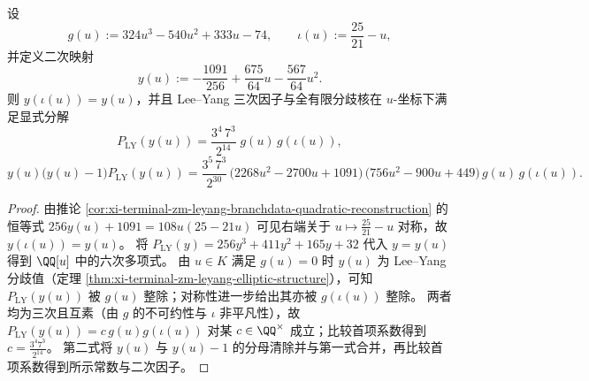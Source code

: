 \begin{proposition}\label{prop:xi-terminal-zm-leyang-double-cover-pullback-factorization}
设
\[
g(u):=324u^{3}-540u^{2}+333u-74,\qquad
\iota(u):=\frac{25}{21}-u,
\]
并定义二次映射
\[
y(u):=-\frac{1091}{256}+\frac{675}{64}u-\frac{567}{64}u^2.
\]
则 \(y(\iota(u))=y(u)\)，并且 Lee--Yang 三次因子与全有限分歧核在 \(u\)-坐标下满足显式分解
\[
P_{\mathrm{LY}}(y(u))=\frac{3^{4}\,7^{3}}{2^{14}}\; g(u)\,g(\iota(u)),
\]
\[
y(u)\bigl(y(u)-1\bigr)P_{\mathrm{LY}}(y(u))
=\frac{3^{5}\,7^{3}}{2^{30}}\,
\bigl(2268u^2-2700u+1091\bigr)\,
\bigl(756u^2-900u+449\bigr)\,
g(u)\,g(\iota(u)).
\]
\end{proposition}
\begin{proof}
由推论 \ref{cor:xi-terminal-zm-leyang-branchdata-quadratic-reconstruction} 的恒等式 \(256y(u)+1091=108u(25-21u)\) 可见右端关于 \(u\mapsto\frac{25}{21}-u\) 对称，故 \(y(\iota(u))=y(u)\)。
将 \(P_{\mathrm{LY}}(y)=256y^3+411y^2+165y+32\) 代入 \(y=y(u)\) 得到 \(\QQ[u]\) 中的六次多项式。
由 \(u\in K\) 满足 \(g(u)=0\) 时 \(y(u)\) 为 Lee--Yang 分歧值（定理 \ref{thm:xi-terminal-zm-leyang-elliptic-structure}），可知 \(P_{\mathrm{LY}}(y(u))\) 被 \(g(u)\) 整除；对称性进一步给出其亦被 \(g(\iota(u))\) 整除。
两者均为三次且互素（由 \(g\) 的不可约性与 \(\iota\) 非平凡性），故
\(
P_{\mathrm{LY}}(y(u))=c\,g(u)g(\iota(u))
\)
对某 \(c\in\QQ^\times\) 成立；比较首项系数得到 \(c=\frac{3^{4}7^{3}}{2^{14}}\)。
第二式将 \(y(u)\) 与 \(y(u)-1\) 的分母清除并与第一式合并，再比较首项系数得到所示常数与二次因子。
\end{proof}

